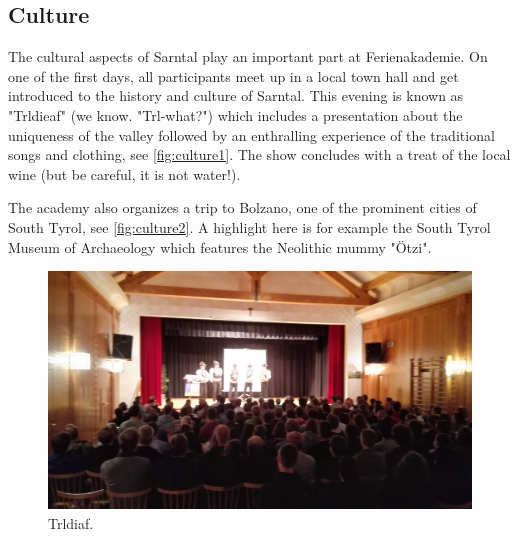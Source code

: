 \subsection{Culture}
The cultural aspects of Sarntal play an important part at Ferienakademie. On one of the first days, all participants meet up in a local town hall and get introduced to the history and culture of Sarntal. This evening is known as "Trldieaf" (we know. "Trl-what?") which includes a presentation about the uniqueness of the valley followed by an enthralling experience of the traditional songs and clothing, see \autoref{fig:culture1}. The show concludes with a treat of the local wine (but be careful, it is not water!). 

The academy also organizes a trip to Bolzano, one of the prominent cities of South Tyrol, see \autoref{fig:culture2}. A highlight here is for example the South Tyrol Museum of Archaeology which features the Neolithic mummy "Ötzi".
\begin{figure}[ht]%
 	\begin{center}%
 		\includegraphics[scale=0.045]{img/Culture1.jpg}%
 		\caption{Trldiaf.}\label{fig:culture1}%
 	\end{center}%
\end{figure} 
